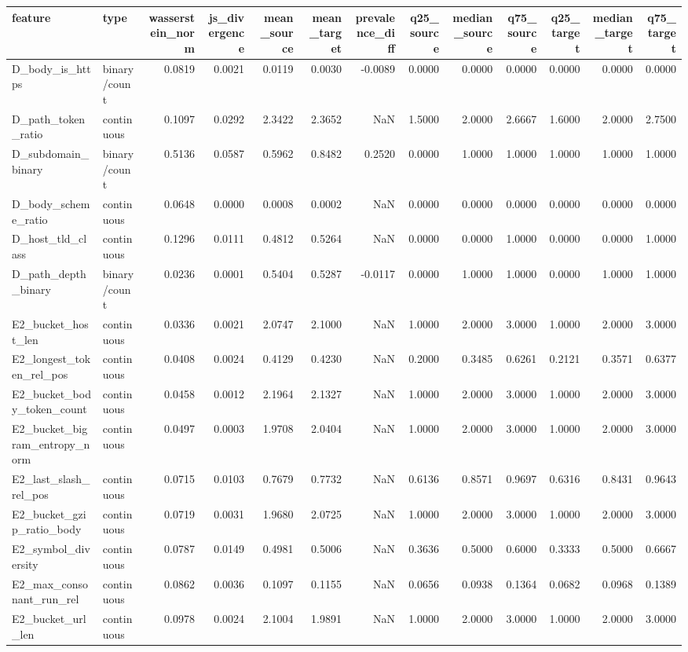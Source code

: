 \begin{tabular}{llrrrrrrrrrrr}
\toprule
feature & type & wasserstein\_norm & js\_divergence & mean\_source & mean\_target & prevalence\_diff & q25\_source & median\_source & q75\_source & q25\_target & median\_target & q75\_target \\
\midrule
D\_body\_is\_https & binary/count & 0.0819 & 0.0021 & 0.0119 & 0.0030 & -0.0089 & 0.0000 & 0.0000 & 0.0000 & 0.0000 & 0.0000 & 0.0000 \\
D\_path\_token\_ratio & continuous & 0.1097 & 0.0292 & 2.3422 & 2.3652 & NaN & 1.5000 & 2.0000 & 2.6667 & 1.6000 & 2.0000 & 2.7500 \\
D\_subdomain\_binary & binary/count & 0.5136 & 0.0587 & 0.5962 & 0.8482 & 0.2520 & 0.0000 & 1.0000 & 1.0000 & 1.0000 & 1.0000 & 1.0000 \\
D\_body\_scheme\_ratio & continuous & 0.0648 & 0.0000 & 0.0008 & 0.0002 & NaN & 0.0000 & 0.0000 & 0.0000 & 0.0000 & 0.0000 & 0.0000 \\
D\_host\_tld\_class & continuous & 0.1296 & 0.0111 & 0.4812 & 0.5264 & NaN & 0.0000 & 0.0000 & 1.0000 & 0.0000 & 0.0000 & 1.0000 \\
D\_path\_depth\_binary & binary/count & 0.0236 & 0.0001 & 0.5404 & 0.5287 & -0.0117 & 0.0000 & 1.0000 & 1.0000 & 0.0000 & 1.0000 & 1.0000 \\
E2\_bucket\_host\_len & continuous & 0.0336 & 0.0021 & 2.0747 & 2.1000 & NaN & 1.0000 & 2.0000 & 3.0000 & 1.0000 & 2.0000 & 3.0000 \\
E2\_longest\_token\_rel\_pos & continuous & 0.0408 & 0.0024 & 0.4129 & 0.4230 & NaN & 0.2000 & 0.3485 & 0.6261 & 0.2121 & 0.3571 & 0.6377 \\
E2\_bucket\_body\_token\_count & continuous & 0.0458 & 0.0012 & 2.1964 & 2.1327 & NaN & 1.0000 & 2.0000 & 3.0000 & 1.0000 & 2.0000 & 3.0000 \\
E2\_bucket\_bigram\_entropy\_norm & continuous & 0.0497 & 0.0003 & 1.9708 & 2.0404 & NaN & 1.0000 & 2.0000 & 3.0000 & 1.0000 & 2.0000 & 3.0000 \\
E2\_last\_slash\_rel\_pos & continuous & 0.0715 & 0.0103 & 0.7679 & 0.7732 & NaN & 0.6136 & 0.8571 & 0.9697 & 0.6316 & 0.8431 & 0.9643 \\
E2\_bucket\_gzip\_ratio\_body & continuous & 0.0719 & 0.0031 & 1.9680 & 2.0725 & NaN & 1.0000 & 2.0000 & 3.0000 & 1.0000 & 2.0000 & 3.0000 \\
E2\_symbol\_diversity & continuous & 0.0787 & 0.0149 & 0.4981 & 0.5006 & NaN & 0.3636 & 0.5000 & 0.6000 & 0.3333 & 0.5000 & 0.6667 \\
E2\_max\_consonant\_run\_rel & continuous & 0.0862 & 0.0036 & 0.1097 & 0.1155 & NaN & 0.0656 & 0.0938 & 0.1364 & 0.0682 & 0.0968 & 0.1389 \\
E2\_bucket\_url\_len & continuous & 0.0978 & 0.0024 & 2.1004 & 1.9891 & NaN & 1.0000 & 2.0000 & 3.0000 & 1.0000 & 2.0000 & 3.0000 \\
\bottomrule
\end{tabular}
